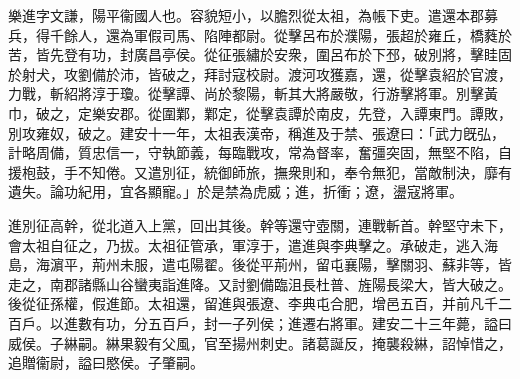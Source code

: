\begin{pinyinscope}
 
 
 樂進字文謙，陽平衞國人也。容貌短小，以膽烈從太祖，為帳下吏。遣還本郡募兵，得千餘人，還為軍假司馬、陷陣都尉。從擊呂布於濮陽，張超於雍丘，橋蕤於苦，皆先登有功，封廣昌亭侯。從征張繡於安衆，圍呂布於下邳，破別將，擊眭固於射犬，攻劉備於沛，皆破之，拜討寇校尉。渡河攻獲嘉，還，從擊袁紹於官渡，力戰，斬紹將淳于瓊。從擊譚、尚於黎陽，斬其大將嚴敬，行游擊將軍。別擊黃巾，破之，定樂安郡。從圍鄴，鄴定，從擊袁譚於南皮，先登，入譚東門。譚敗，別攻雍奴，破之。建安十一年，太祖表漢帝，稱進及于禁、張遼曰：「武力旣弘，計略周備，質忠信一，守執節義，每臨戰攻，常為督率，奮彊突固，無堅不陷，自援枹鼓，手不知倦。又遣別征，統御師旅，撫衆則和，奉令無犯，當敵制決，靡有遺失。論功紀用，宜各顯寵。」於是禁為虎威；進，折衝；遼，盪寇將軍。
 
 
 
 
 進別征高幹，從北道入上黨，回出其後。幹等還守壺關，連戰斬首。幹堅守未下，會太祖自征之，乃拔。太祖征管承，軍淳于，遣進與李典擊之。承破走，逃入海島，海濵平，荊州未服，遣屯陽翟。後從平荊州，留屯襄陽，擊關羽、蘇非等，皆走之，南郡諸縣山谷蠻夷詣進降。又討劉備臨沮長杜普、旌陽長梁大，皆大破之。後從征孫權，假進節。太祖還，留進與張遼、李典屯合肥，增邑五百，并前凡千二百戶。以進數有功，分五百戶，封一子列侯；進遷右將軍。建安二十三年薨，謚曰威侯。子綝嗣。綝果毅有父風，官至揚州刺史。諸葛誕反，掩襲殺綝，詔悼惜之，追贈衞尉，謚曰愍侯。子肇嗣。
 
 
\end{pinyinscope}